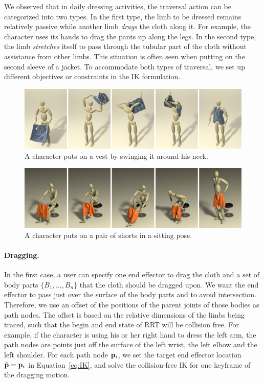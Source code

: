 We observed that in daily dressing activities, the traversal action can be categorized into two types. In the first type, the limb to be dressed remains relatively passive while another limb \emph{drags} the cloth along it. For example, the character uses its hands to drag the pants up along the legs. In the second type, the limb \emph{stretches} itself to pass through the tubular part of the cloth without assistance from other limbs. This situation is often seen when putting on the second sleeve of a jacket. To accommodate both types of traversal, we set up different objectives or constraints in the IK formulation.


\begin{figure}[!t]
  \centering
  \includegraphics[width=\textwidth]{images/vest}
  \caption{A character puts on a vest by swinging it around his neck.}
  \label{fig:vest}
  \vspace*{-0.05 in}
\end{figure}

\begin{figure}[!t]
  \centering
  \includegraphics[width=\textwidth]{images/shortsSitting}
  \caption{A character puts on a pair of shorts in a sitting pose.}
  \label{fig:shorts1}
  \vspace*{-0.2 in}
\end{figure}



\paragraph{Dragging.} In the first case, a user can specify one end effector to drag the cloth and a set of body parts $\{B_1 ,..., B_n\}$ that the cloth should be dragged upon. We want the end effector to pass just over the surface of the body parts and to avoid intersection. Therefore, we use an offset of the positions of the parent joints of those bodies as path nodes. The offset is based on the relative dimensions of the limbs being traced, such that the begin and end state of RRT will be collision free. For example, if the character is using his or her right hand to dress the left arm, the path nodes are points just off the surface of the left wrist, the left elbow and the left shoulder. For each path node $\mathbf{p}_i$, we set the target end effector location $\hat{\mathbf{p}}=\mathbf{p}_i$ in Equation~\ref{eq:IK}, and solve the collision-free IK for one keyframe of the dragging motion.

